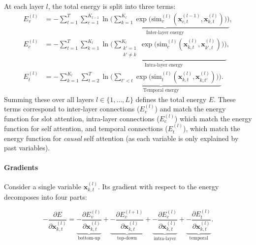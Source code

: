 \documentclass{article}
\begin{document}
At each layer \(l\), the total energy is split into three terms:
\begin{equation}
    \begin{aligned}
    E_{v}^{(l)}
    &=
    -\sum_{t=1}^T
    \sum_{c=1}^{K_{l-1}}
    \underbrace{
    \ln \Biggl(
    \sum_{k=1}^{K_l}
    \exp\bigl(\mathrm{sim}_{v}^{(l)}(\bm{x}_{c,t}^{(l-1)}, \bm{x}_{k,t}^{(l)})\bigr)
    \Biggr)
    }_{\text{Inter-layer energy}},
    \\
    E_{c}^{(l)}
    &=
    -\sum_{t=1}^T
    \sum_{k=1}^{K_l}
    \underbrace{
    \ln \Biggl(
    \sum_{\substack{k'=1 \\ k'\neq k}}^{K_l}
    \exp\bigl(\mathrm{sim}_{c}^{(l)}(\bm{x}_{k,t}^{(l)}, \bm{x}_{k',t}^{(l)})\bigr)
    \Biggr)
    }_{\text{Intra-layer energy}},
    \\
    E_{t}^{(l)}
    &=
    -\sum_{k=1}^{K_l}
    \sum_{t=2}^T
    \underbrace{
    \ln \Biggl(
    \sum_{t'<t}
    \exp\bigl(\mathrm{sim}_{t}^{(l)}(\bm{x}_{k,t}^{(l)}, \bm{x}_{k,t'}^{(l)})\bigr)
    \Biggr)
    }_{\text{Temporal energy}}.
    \end{aligned}
    \end{equation}
Summing these over all layers \(l \in \{1, \dots, L\}\) defines the total energy \(E\). These terms correspond to inter-layer connections (\(E_{v}^{(l)}\)) and match the energy function for slot attention, intra-layer connections (\(E_{c}^{(l)}\)) which match the energy function for self attention, and temporal connections (\(E_{t}^{(l)}\)), which match the energy function for \emph{causal} self attention (as each variable is only explained by past variables).

\paragraph{Gradients}
Consider a single variable \(\bm{x}_{k,t}^{(l)}\). Its gradient with respect to the energy decomposes into four parts:

\begin{equation}
-\frac{\partial E}{\partial \bm{x}_{k,t}^{(l)}} = 
\underbrace{-\frac{\partial E_{v}^{(l)}}{\partial \bm{x}_{k,t}^{(l)}}}_{\text{bottom-up}} 
+ 
\underbrace{-\frac{\partial E_{v}^{(l+1)}}{\partial \bm{x}_{k,t}^{(l)}}}_{\text{top-down}} 
+ 
\underbrace{-\frac{\partial E_{c}^{(l)}}{\partial \bm{x}_{k,t}^{(l)}}}_{\text{intra-layer}} 
+ 
\underbrace{-\frac{\partial E_{t}^{(l)}}{\partial \bm{x}_{k,t}^{(l)}}}_{\text{temporal}}.
\end{equation}
\end{document}
